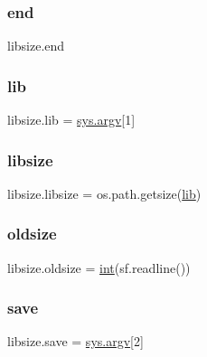 \mbox{\label{namespacelibsize_a5957fc1e6f6b0ee7cd77e1e062369d35}} 
\subsubsection{\texorpdfstring{end}{end}}
{\footnotesize\ttfamily libsize.\+end}

\mbox{\label{namespacelibsize_aebe401e0d6ac1f39df37ccbcbb02fcd6}} 
\subsubsection{\texorpdfstring{lib}{lib}}
{\footnotesize\ttfamily libsize.\+lib = \mbox{\hyperlink{pythonrun_8h_af3cb49c013b6d4b79e7a00fc6807e954}{sys.\+argv}}\mbox{[}1\mbox{]}}

\mbox{\label{namespacelibsize_ad37fa50fa82936587fef9eb4a4e6bb5b}} 
\subsubsection{\texorpdfstring{libsize}{libsize}}
{\footnotesize\ttfamily libsize.\+libsize = os.\+path.\+getsize(\mbox{\hyperlink{namespacelibsize_aebe401e0d6ac1f39df37ccbcbb02fcd6}{lib}})}

\mbox{\label{namespacelibsize_a639adbdcebcdf2f4fc0eb0c7a4a7f546}} 
\subsubsection{\texorpdfstring{oldsize}{oldsize}}
{\footnotesize\ttfamily libsize.\+oldsize = \mbox{\hyperlink{warnings_8h_a74f207b5aa4ba51c3a2ad59b219a423b}{int}}(sf.\+readline())}

\mbox{\label{namespacelibsize_a54b9405a54b4089591f0941f0f5eae9b}} 
\subsubsection{\texorpdfstring{save}{save}}
{\footnotesize\ttfamily libsize.\+save = \mbox{\hyperlink{pythonrun_8h_af3cb49c013b6d4b79e7a00fc6807e954}{sys.\+argv}}\mbox{[}2\mbox{]}}

